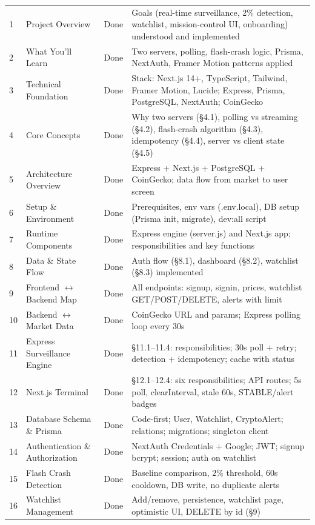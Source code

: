 \documentclass[11pt,a4paper]{report}
\begin{document}
\begin{longtable}{@{}p{1.2em} p{4.2cm} p{1.8cm} p{5.8cm}@{}}
  1  & Project Overview & Done & Goals (real-time surveillance, 2\% detection, watchlist, mission-control UI, onboarding) understood and implemented \\
  2  & What You'll Learn & Done & Two servers, polling, flash-crash logic, Prisma, NextAuth, Framer Motion patterns applied \\
  3  & Technical Foundation & Done & Stack: Next.js 14+, TypeScript, Tailwind, Framer Motion, Lucide; Express, Prisma, PostgreSQL, NextAuth; CoinGecko \\
  4  & Core Concepts & Done & Why two servers (\S4.1), polling vs streaming (\S4.2), flash-crash algorithm (\S4.3), idempotency (\S4.4), server vs client state (\S4.5) \\
  5  & Architecture Overview & Done & Express + Next.js + PostgreSQL + CoinGecko; data flow from market to user screen \\
  6  & Setup \& Environment & Done & Prerequisites, env vars (.env.local), DB setup (Prisma init, migrate), dev:all script \\
  7  & Runtime Components & Done & Express engine (server.js) and Next.js app; responsibilities and key functions \\
  8  & Data \& State Flow & Done & Auth flow (\S8.1), dashboard (\S8.2), watchlist (\S8.3) implemented \\
  9  & Frontend $\leftrightarrow$ Backend Map & Done & All endpoints: signup, signin, prices, watchlist GET/POST/DELETE, alerts with limit \\
  10 & Backend $\leftrightarrow$ Market Data & Done & CoinGecko URL and params; Express polling loop every 30s \\
  11 & Express Surveillance Engine & Done & \S11.1--11.4: responsibilities; 30s poll + retry; detection + idempotency; cache with status \\
  12 & Next.js Terminal & Done & \S12.1--12.4: six responsibilities; API routes; 5s poll, clearInterval, stale 60s, STABLE/alert badges \\
  13 & Database Schema \& Prisma & Done & Code-first; User, Watchlist, CryptoAlert; relations; migrations; singleton client \\
  14 & Authentication \& Authorization & Done & NextAuth Credentials + Google; JWT; signup bcrypt; session; auth on watchlist \\
  15 & Flash Crash Detection & Done & Baseline comparison, 2\% threshold, 60s cooldown, DB write, no duplicate alerts \\
  16 & Watchlist Management & Done & Add/remove, persistence, watchlist page, optimistic UI, DELETE by id (\S9) \\

\end{longtable}
\end{document}
